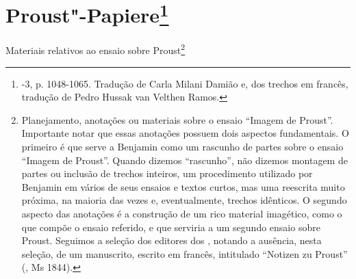 \chapter{Proust"-Papiere\footnote[*]{-3, p. 1048-1065. Tradução de Carla Milani Damião e, dos trechos em francês, tradução de
  Pedro Hussak van Velthen Ramos.}}

\begin{center}
Materiais relativos ao ensaio sobre Proust\footnote{Planejamento,
  anotações ou materiais sobre o ensaio ``Imagem de Proust''.
  Importante notar que essas anotações possuem dois aspectos
  fundamentais. O primeiro é que serve a Benjamin como um rascunho de
  partes sobre o ensaio ``Imagem de Proust''. Quando dizemos
  ``rascunho'', não dizemos montagem de partes ou inclusão de trechos
  inteiros, um procedimento utilizado por Benjamin em vários de seus
  ensaios e textos curtos, mas uma reescrita muito próxima, na maioria
  das vezes e, eventualmente, trechos idênticos. O segundo aspecto
  das anotações é a construção de um rico material imagético, como o que
  compõe o ensaio referido, e que serviria a um segundo ensaio sobre
  Proust. Seguimos a seleção dos editores dos , notando a
  ausência, nesta seleção, de um manuscrito, escrito em francês,
  intitulado ``Notizen zu Proust'' (, Ms 1844).} %
\end{center}


